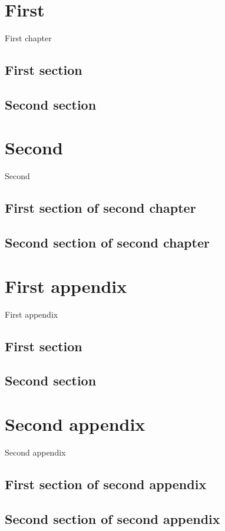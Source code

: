 \documentclass[oneside]{book}
\begin{document}
\doparttoc \dominitoc %
\tableofcontents
\mtcaddchapter %
\chapter{First}
\minitoc
First chapter
\section{First section} \lipsum[1]
\section{Second section} \lipsum[2]
\chapter{Second}
\minitoc
Second
\section{First section of second chapter} \lipsum[3]
\section{Second section of second chapter} \lipsum[4]
\appendix      %
\adjustptc     %
\parttoc       %
\begin{mtchideinmaintoc}[-1] %
\chapter{First appendix}
\minitoc
First appendix
\section{First section} \lipsum[5]
\section{Second section} \lipsum[6]
\chapter{Second appendix}
\minitoc
Second appendix
\section{First section of second appendix} \lipsum[7]
\section{Second section of second appendix} \lipsum[8]
\end{mtchideinmaintoc} %
\end{document}
